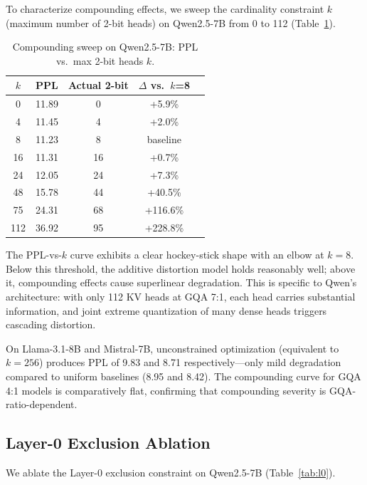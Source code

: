 \documentclass[11pt]{article}
\begin{document}
To characterize compounding effects, we sweep the cardinality constraint $k$ (maximum number of 2-bit heads) on Qwen2.5-7B from 0 to 112 (Table~\ref{tab:compounding}).

\begin{table}[h]
\centering
\caption{Compounding sweep on Qwen2.5-7B: PPL vs.\ max 2-bit heads $k$.}
\label{tab:compounding}
\begin{tabular}{ccccc}
\toprule
\textbf{$k$} & \textbf{PPL} & \textbf{Actual 2-bit} & \textbf{$\Delta$ vs.\ $k$=8} \\
\midrule
0   & 11.89 & 0  & +5.9\% \\
4   & 11.45 & 4  & +2.0\% \\
8   & 11.23 & 8  & baseline \\
16  & 11.31 & 16 & +0.7\% \\
24  & 12.05 & 24 & +7.3\% \\
48  & 15.78 & 44 & +40.5\% \\
75  & 24.31 & 68 & +116.6\% \\
112 & 36.92 & 95 & +228.8\% \\
\bottomrule
\end{tabular}
\end{table}

The PPL-vs-$k$ curve exhibits a clear hockey-stick shape with an elbow at $k=8$.
Below this threshold, the additive distortion model holds reasonably well; above it, compounding effects cause superlinear degradation.
This is specific to Qwen's architecture: with only 112 KV heads at GQA 7:1, each head carries substantial information, and joint extreme quantization of many dense heads triggers cascading distortion.

On Llama-3.1-8B and Mistral-7B, unconstrained optimization (equivalent to $k=256$) produces PPL of 9.83 and 8.71 respectively---only mild degradation compared to uniform baselines (8.95 and 8.42).
The compounding curve for GQA 4:1 models is comparatively flat, confirming that compounding severity is GQA-ratio-dependent.

\subsection{Layer-0 Exclusion Ablation}
\label{sec:l0}

We ablate the Layer-0 exclusion constraint on Qwen2.5-7B (Table~\ref{tab:l0}).
\end{document}
